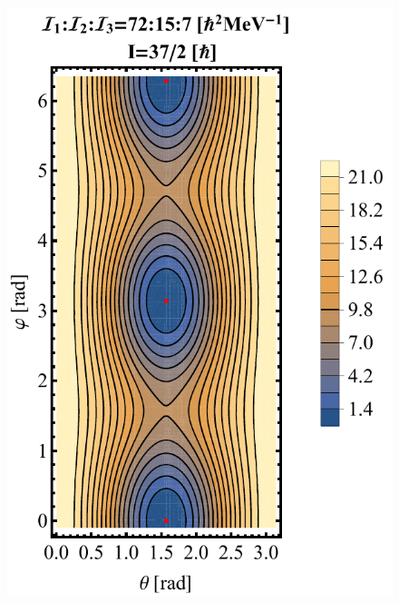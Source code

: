 \documentclass[%
 reprint,
 amsmath,
 amssymb,
 aps,
 floatfix,
]{revtex4-2}
\begin{document}
\begin{figure}
    \centering
    \includegraphics[scale=0.55]{images/contour-tsd3.pdf}

\end{figure}
\end{document}

